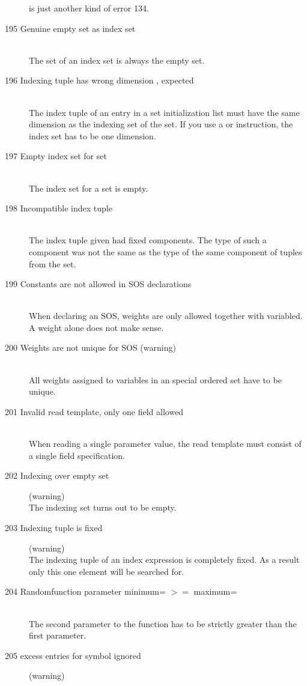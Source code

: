 \begin{description}
  is just another kind of error 134.
\item[195 Genuine empty set as index set]\ \\
  The set of an index set is always the empty set.
\item[196 Indexing tuple \code{xxx} has wrong dimension
           \code{yyy}, expected \code{zzz}]\ \\
  The index tuple of an entry in a set initialization list must
  have the same dimension as the indexing set of the set. 
  If you use a  or  instruction, the index
  set has to be one dimension.
\item[197 Empty index set for set]\ \\
  The index set for a set is empty.
\item[198 Incompatible index tuple]\ \\
  The index tuple given had fixed components. The type of such a
  component was not the same as the type of the same component of tuples
  from the set.
\item[199 Constants are not allowed in SOS declarations]\ \\
  When declaring an SOS, weights are only allowed together with
  variabled. A weight alone does not make sense.
\item[200 Weights are not unique for SOS \code{xxx} (warning)]\ \\
  All weights assigned to variables in an special ordered set have to
  be unique. 
\item[201 Invalid read template, only one field allowed]\ \\
  When reading a single parameter value, the read template must
  consist of a single field specification.
\item[202 Indexing over empty set] (warning)\ \\
  The indexing set turns out to be empty.
\item[203 Indexing tuple is fixed] (warning)\ \\
  The indexing tuple of an index expression is completely fixed. As a
  result only this one element will be searched for.
\item[204 Randomfunction parameter minimum= \code{xxx} $>=$ maximum=
  \code{yyy}]\ \\
  The second parameter to the function  has to be
  strictly greater than the first parameter.
\item[205 \code{xxx} excess entries for symbol \code{yyy} ignored ]
  (warning)\ \\

\end{description}
